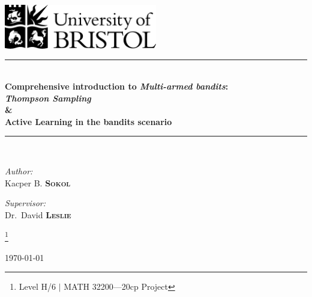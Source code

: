\documentclass[12pt, a4paper, pdflatex, leqno, twoside]{report}
\newcommand{\HRule}{\rule{\linewidth}{0.5mm}}
\begin{document}
\begin{titlepage}
\begin{center}
\includegraphics[width=0.5\textwidth]{graphics/UOB-logo.png}~\\[2.5cm] %




\HRule \\[0.4cm]
{ \huge \bfseries %
	Comprehensive introduction to \emph{\textbf{Multi-armed bandits}}:\\[.5cm]
  \emph{Thompson Sampling}\\
  \&\\
  Active Learning in the bandits scenario\\[0.4cm] }
\HRule \\[1.5cm]

\begin{minipage}{0.4\textwidth}
\begin{flushleft} \large
\emph{Author:}\\
Kacper B. \textsc{\textbf{Sokol}}
\end{flushleft}
\end{minipage}
\begin{minipage}{0.4\textwidth}
\begin{flushright} \large
\emph{Supervisor:} \\
Dr.~David \textsc{\textbf{Leslie}}
\end{flushright}
\end{minipage}

\let\thefootnote\relax\footnote{Level H/6 $|$ MATH 32200---20cp Project}

\vfill

{\large \today}
\end{center}
\end{titlepage}
\end{document}
